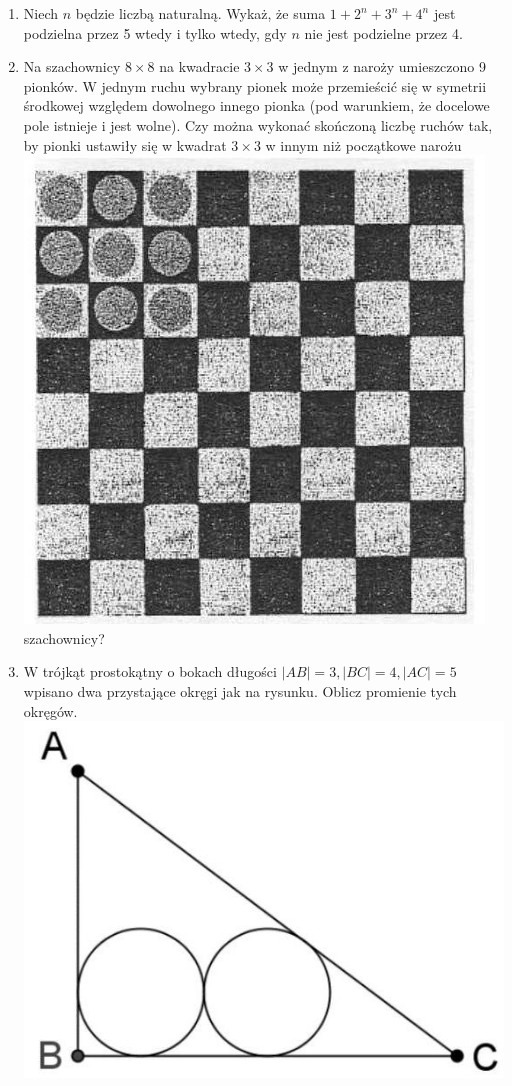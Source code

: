\documentclass[10pt]{article}
\begin{document}
\begin{enumerate}
  \item Niech \(n\) będzie liczbą naturalną. Wykaż, że suma \(1+2^{n}+3^{n}+4^{n}\) jest podzielna przez 5 wtedy i tylko wtedy, gdy \(n\) nie jest podzielne przez 4.
  \item Na szachownicy \(8 \times 8\) na kwadracie \(3 \times 3\) w jednym z naroży umieszczono 9 pionków. W jednym ruchu wybrany pionek może przemieścić się w symetrii środkowej względem dowolnego innego pionka (pod warunkiem, że docelowe pole istnieje i jest wolne). Czy można wykonać skończoną liczbę ruchów tak, by pionki ustawiły się w kwadrat \(3 \times 3\) w innym niż początkowe narożu\\
\includegraphics[max width=\textwidth, center]{2024_11_21_849b0c0f12e262df7209g-1(1)}\\
szachownicy?
  \item W trójkąt prostokątny o bokach długości \(|A B|=3,|B C|=4,|A C|=5\) wpisano dwa przystające okręgi jak na rysunku. Oblicz promienie tych okręgów.\\
\includegraphics[max width=\textwidth, center]{2024_11_21_849b0c0f12e262df7209g-1}
\end{enumerate}
\end{document}
